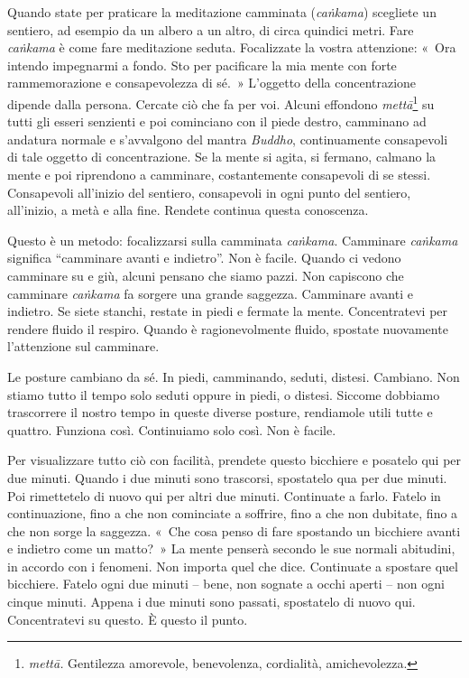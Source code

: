 Quando state per praticare la meditazione camminata (\emph{caṅkama})
scegliete un sentiero, ad esempio da un albero a un altro, di circa
quindici metri. Fare \emph{caṅkama} è come fare meditazione seduta.
Focalizzate la vostra attenzione: «~Ora intendo impegnarmi a fondo. Sto
per pacificare la mia mente con forte rammemorazione e consapevolezza di
sé.~» L'oggetto della concentrazione dipende dalla persona. Cercate ciò
che fa per voi. Alcuni effondono \emph{mettā}\footnote{\emph{mettā.}
  Gentilezza amorevole, benevolenza, cordialità, amichevolezza.} su
tutti gli esseri senzienti e poi cominciano con il piede destro,
camminano ad andatura normale e s'avvalgono del mantra \emph{Buddho},
continuamente consapevoli di tale oggetto di concentrazione. Se la mente
si agita, si fermano, calmano la mente e poi riprendono a camminare,
costantemente consapevoli di se stessi. Consapevoli all'inizio del
sentiero, consapevoli in ogni punto del sentiero, all'inizio, a metà e
alla fine. Rendete continua questa conoscenza.

Questo è un metodo: focalizzarsi sulla camminata \emph{caṅkama}.
Camminare \emph{caṅkama} significa ``camminare avanti e indietro''. Non
è facile. Quando ci vedono camminare su e giù, alcuni pensano che siamo
pazzi. Non capiscono che camminare \emph{caṅkama} fa sorgere una grande
saggezza. Camminare avanti e indietro. Se siete stanchi, restate in
piedi e fermate la mente. Concentratevi per rendere fluido il respiro.
Quando è ragionevolmente fluido, spostate nuovamente l'attenzione sul
camminare.

Le posture cambiano da sé. In piedi, camminando, seduti, distesi.
Cambiano. Non stiamo tutto il tempo solo seduti oppure in piedi, o
distesi. Siccome dobbiamo trascorrere il nostro tempo in queste diverse
posture, rendiamole utili tutte e quattro. Funziona così. Continuiamo
solo così. Non è facile.

Per visualizzare tutto ciò con facilità, prendete questo bicchiere e
posatelo qui per due minuti. Quando i due minuti sono trascorsi,
spostatelo qua per due minuti. Poi rimettetelo di nuovo qui per altri
due minuti. Continuate a farlo. Fatelo in continuazione, fino a che non
cominciate a soffrire, fino a che non dubitate, fino a che non sorge la
saggezza. «~Che cosa penso di fare spostando un bicchiere avanti e
indietro come un matto?~» La mente penserà secondo le sue normali
abitudini, in accordo con i fenomeni. Non importa quel che dice.
Continuate a spostare quel bicchiere. Fatelo ogni due minuti -- bene,
non sognate a occhi aperti -- non ogni cinque minuti. Appena i due
minuti sono passati, spostatelo di nuovo qui. Concentratevi su questo. È
questo il punto.

